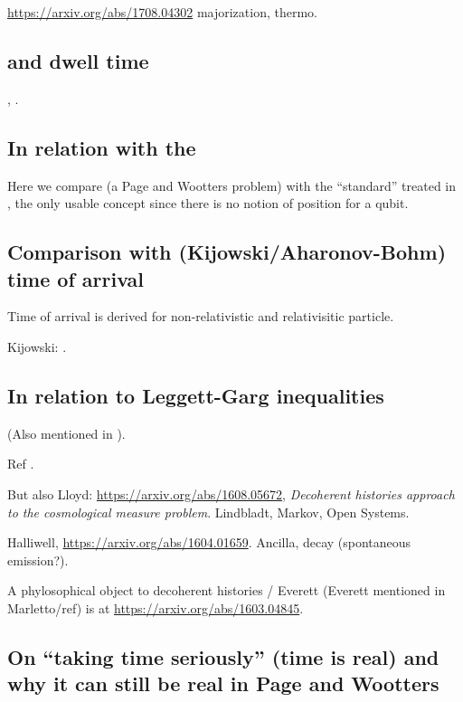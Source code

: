 \url{https://arxiv.org/abs/1708.04302} majorization, thermo.


\subsection{and dwell time}

\cite[\S 5]{TQM2}, \cite{YearsleyHalliwell_Clocks}.

\subsection{In relation with the }

Here we compare \cite{Moreva:synthetic, Moreva:illustration}
(a Page and Wootters problem)
with the ``standard'' 
treated in \cite[\S 5.5.2]{TQM2},
the only usable concept since there is no notion of position
for a qubit.

\subsection{Comparison with (Kijowski/Aharonov-Bohm) time of arrival}

Time of arrival is derived for non-relativistic \parencite{Delgado_TOA, Delgado_TOA2}
and relativisitic \parencite{Leon_TOA_R}
particle.

Kijowski: \cite{Kijowski_Time, Kijowski_Comment}.

\subsection{In relation to Leggett-Garg inequalities}
(Also mentioned in \cite{Moreva_position}).

Ref \cite{LeggettGarg+PageWootters}.

But also Lloyd: \url{https://arxiv.org/abs/1608.05672},
\emph{Decoherent histories approach to the cosmological measure problem}.
Lindbladt, Markov, Open Systems.

Halliwell, \url{https://arxiv.org/abs/1604.01659}. Ancilla, decay (spontaneous emission?).

A phylosophical object to decoherent histories / Everett (Everett mentioned in Marletto/ref)
is at
\url{https://arxiv.org/abs/1603.04845}.



\subsection{On ``taking time seriously'' (time is real) and why it can still be real in Page and Wootters}

